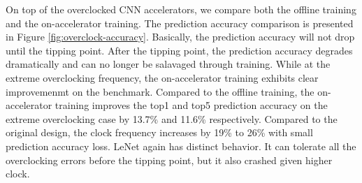 On top of the overclocked CNN accelerators, we compare both the offline training and the on-accelerator training.
The prediction accuracy comparison is presented in Figure \ref{fig:overclock-accuracy}. 
Basically, the prediction accuracy will not drop until the tipping point. After the tipping point, the 
prediction accuracy degrades dramatically and can no longer be salavaged through training.
While at the extreme overclocking frequency, the on-accelerator training exhibits clear 
improvemenmt on the benchmark. Compared to the offline training, 
the on-accelerator training improves the top1 and top5 prediction accuracy 
on the extreme overclocking case by 13.7\% and 11.6\% respectively.
Compared to the original design, the clock frequency 
increases by 19\% to 26\% with small prediction accuracy loss. 
LeNet again has distinct behavior. It can tolerate all the
overclocking errors before the tipping point, but it 
also crashed given higher clock.

